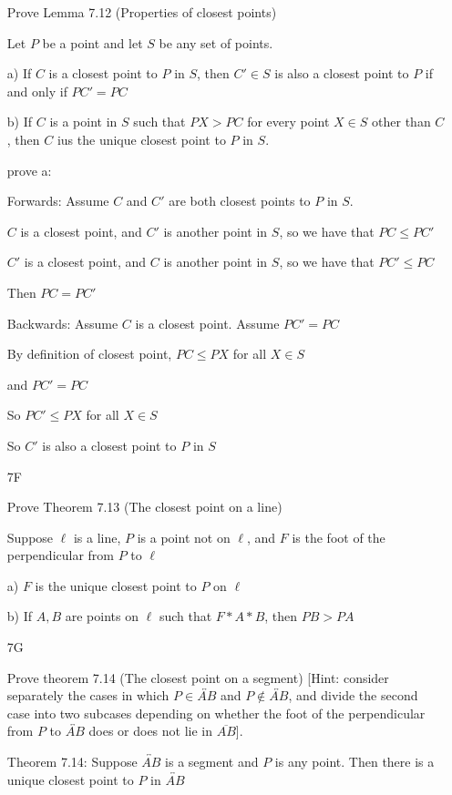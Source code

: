 \documentclass[11pt]{article}
\newcommand{\lines}[1]{\overleftrightarrow{#1}}
\newcommand{\segment}[1]{\overline{#1}}
\begin{document}
\begin{itemize}
	Prove Lemma 7.12 (Properties of closest points)

	Let $P$ be a point and let $S$ be any set of points.

		a) If $C$ is a closest point to $P$ in $S$, then $C' \in S$ is also a closest point to $P$ if and only if $PC' = PC$

		b) If $C$ is a point in $S$ such that $PX > PC$ for every point $X \in S$ other than $C$, then $C$ ius the unique closest point to $P$ in $S$.

	prove a: 
	
	Forwards: Assume $C$ and $C'$ are both closest points to $P$ in $S$. 
		
	$C$ is a closest point, and $C'$ is another point in $S$, so we have that $PC \leq PC'$

	$C'$ is a closest point, and $C$ is another point in $S$, so we have that $PC' \leq PC$

	Then $PC = PC'$

	Backwards: Assume $C$ is a closest point. Assume $PC' = PC$ 

	By definition of closest point, $PC \leq PX$ for all $X \in S$ 

	and $PC' = PC$

	So $PC' \leq PX$ for all $X \in S$

	So $C'$ is also a closest point to $P$ in $S$

\item[7F]

	Prove Theorem 7.13 (The closest point on a line)

	Suppose $\ell$ is a line, $P$ is a point not on $\ell$, and $F$ is the foot of the perpendicular from $P$ to $\ell$ 

	a) $F$ is the unique closest point to $P$ on $\ell$

	b) If $A, B$ are points on $\ell$ such that $F * A * B$, then $PB > PA$

\item[7G]

	Prove theorem 7.14 (The closest point on a segment) [Hint: consider separately the cases in which $P\in \lines{AB}$ and $P\not\in \lines{AB}$, and divide the second case into two subcases depending on whether the foot of the perpendicular from $P$ to $\lines{AB}$ does or does not lie in $\segment{AB}$].

	Theorem 7.14: Suppose $\lines{AB}$ is a segment and $P$ is any point. Then there is a unique closest point to $P$ in $\lines{AB}$
\end{itemize}
\end{document}
